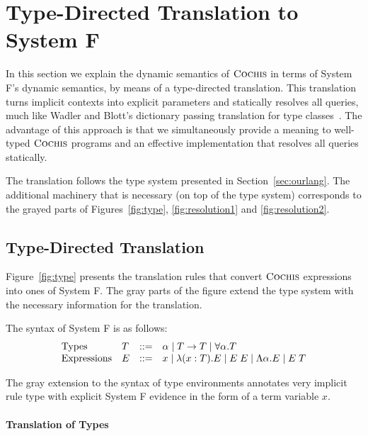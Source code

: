 \section{Type-Directed Translation to System F}
\label{sec:trans}

In this section we explain the dynamic semantics of $\textsc{Cochis}$ in terms
of System F's dynamic semantics, by means of a type-directed translation. 
This translation turns implicit contexts into explicit parameters and
statically resolves all queries, much like Wadler and Blott's dictionary
passing translation for type classes~\cite{adhoc}. 
The advantage of this approach is that we simultaneously provide a meaning to
well-typed $\textsc{Cochis}$ programs and an effective implementation that resolves
all queries statically.

The translation follows the type system presented in Section~\ref{sec:ourlang}.
The additional machinery that is necessary (on top of the type system)
corresponds to the grayed parts of Figures~\ref{fig:type}, \ref{fig:resolution1} and \ref{fig:resolution2}. 

\subsection{Type-Directed Translation}
Figure~\ref{fig:type} presents the translation rules that convert $\textsc{Cochis}$
expressions into ones of System F. 
The gray parts of the figure extend the type system with the necessary
information for the translation.

The syntax of System F is as follows: 
{\small
  \[ \begin{array}{llrl}
    \text{Types} & T & ::= & \alpha \mid T \rightarrow T 
    \mid \forall \alpha. T \\ 
    \text{Expressions} & E & ::=  & x \mid \lambda (x:T) . E \mid E\;E
    \mid \Lambda \alpha . E \mid E\;T 
  \end{array} \]}

The gray extension to the syntax of type environments annotates very
implicit rule type with explicit System F evidence in the form of a 
term variable $x$.

\paragraph{Translation of Types}

